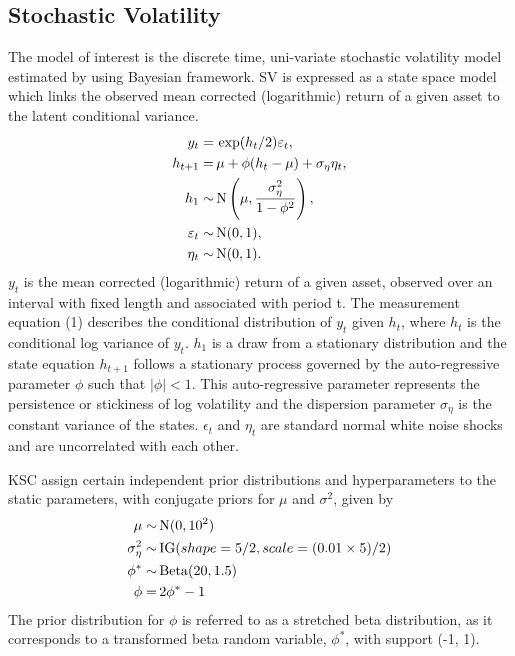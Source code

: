 \documentclass[12pt, a4paper]{article}
\begin{document}
\subsection{Stochastic Volatility}
    The model of interest is the discrete time, uni-variate stochastic volatility model estimated by \citet{kim1998stochastic} using Bayesian framework. SV is expressed as a state space model which links the observed mean corrected (logarithmic) return of a given asset to the latent conditional variance. 
    \begin{align}
    y_t =& \space \,\exp(h_t/2) \varepsilon_t, \\
    h_{t+1} =& \space \, \mu +\phi(h_t - \mu) + \sigma_{\eta} \eta_t,  \\
    h_1 \sim& \space \,\mathrm{N}\left(\mu, \frac{\sigma_{\eta}^2}{1-\phi^2}\right), \\
    \varepsilon_t \sim& \space \,\mathrm{N}(0,1), \\
    \eta_t \sim& \space \,\mathrm{N}(0,1).
    \end{align}
    $y_t$ is the mean corrected (logarithmic) return of a given asset, observed over an interval with fixed length and associated with period t. The measurement equation (1) describes the conditional distribution of $y_t$ given $h_t$, where $h_t$ is the conditional log variance of $y_t$. $h_1$ is a draw from a stationary distribution and the state equation $h_{t+1}$ follows a stationary process governed by the auto-regressive parameter $\phi$ such that $|\phi|<1$. This auto-regressive parameter represents the persistence or stickiness of log volatility and the dispersion parameter $\sigma_{\eta}$ is the constant variance of the states. $\epsilon_t$ and $\eta_t$ are standard normal white noise shocks and are uncorrelated with each other.

    KSC assign certain independent prior distributions and hyperparameters to the static parameters, with conjugate priors for $\mu$ and $\sigma^2$, given by
    \begin{align}
    \mu \sim& \space \,\mathrm{N}(0, 10^2) \\
    \sigma_{\eta}^2 \sim& \space \, \mathrm{IG}(shape=5/2, scale=(0.01\times 5) / 2) \\
    \phi^{\ast} \sim& \space \,\mathrm{Beta}(20, 1.5) \\
    \phi =& \space \, 2\phi^{\ast} - 1
    \end{align}
    The prior distribution for $\phi$ is referred to as a stretched beta distribution, as it corresponds to a transformed beta random variable, $\phi^*$, with support (-1, 1).
    
\end{document}
